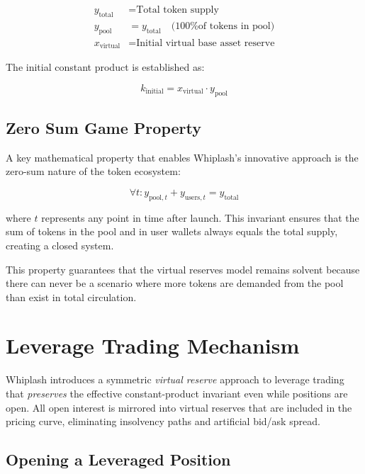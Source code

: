 \documentclass[11pt]{article}
\begin{document}
\begin{equation}
\begin{aligned}
y_{\text{total}} &= \text{Total token supply} \\
y_{\text{pool}} &= y_{\text{total}} \quad \text{(100\% of tokens in pool)} \\
x_{\text{virtual}} &= \text{Initial virtual base asset reserve}
\end{aligned}
\end{equation}

The initial constant product is established as:

\begin{equation}
k_{\text{initial}} = x_{\text{virtual}} \cdot y_{\text{pool}}
\end{equation}

\subsection{Zero Sum Game Property}

A key mathematical property that enables Whiplash's innovative approach is the zero-sum nature of the token ecosystem:

\begin{equation}
\forall t: y_{\text{pool},t} + y_{\text{users},t} = y_{\text{total}}
\end{equation}

where $t$ represents any point in time after launch. This invariant ensures that the sum of tokens in the pool and in user wallets always equals the total supply, creating a closed system.

This property guarantees that the virtual reserves model remains solvent because there can never be a scenario where more tokens are demanded from the pool than exist in total circulation.

\section{Leverage Trading Mechanism}

Whiplash introduces a symmetric \emph{virtual reserve} approach to leverage trading that \emph{preserves} the effective constant-product invariant even while positions are open. All open interest is mirrored into virtual reserves that are included in the pricing curve, eliminating insolvency paths and artificial bid/ask spread.

\subsection{Opening a Leveraged Position}
\end{document}
